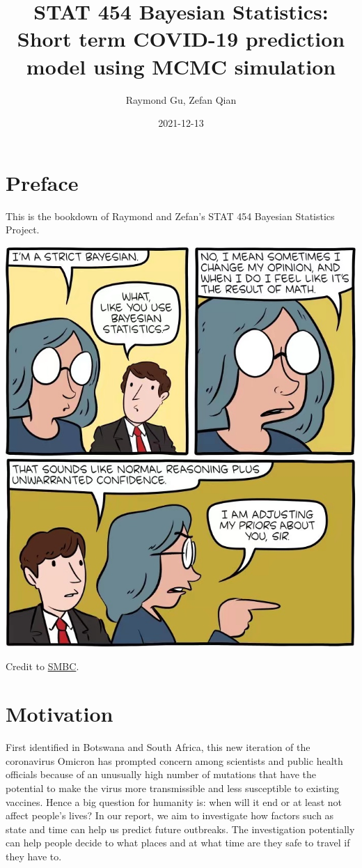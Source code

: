 \documentclass[
]{book}
\title{STAT 454 Bayesian Statistics: Short term COVID-19 prediction model using MCMC simulation}
\author{Raymond Gu, Zefan Qian}
\date{2021-12-13}
\begin{document}
\maketitle

{
\setcounter{tocdepth}{1}
\tableofcontents
}
\hypertarget{preface}{%
\chapter{Preface}\label{preface}}

This is the bookdown of Raymond and Zefan's STAT 454 Bayesian Statistics Project.

\includegraphics{preface_comic.jpg}

Credit to \href{smbc-comics.com}{SMBC}.

\hypertarget{intro}{%
\chapter{Motivation}\label{intro}}

First identified in Botswana and South Africa, this new iteration of the coronavirus Omicron has prompted concern among scientists and public health officials because of an unusually high number of mutations that have the potential to make the virus more transmissible and less susceptible to existing vaccines. Hence a big question for humanity is: when will it end or at least not affect people's lives? In our report, we aim to investigate how factors such as state and time can help us predict future outbreaks. The investigation potentially can help people decide to what places and at what time are they safe to travel if they have to.
\end{document}

